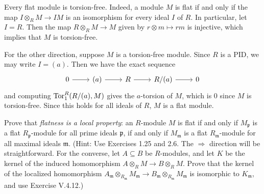\documentclass[../../master.tex]{subfiles}
\begin{document}
\begin{solution}
    Every flat module is torsion-free.
    Indeed, a module $M$ is flat if and only if the map $I \otimes_R M \to IM$ is an isomorphism for every ideal $I$ of $R$.
    In particular, let $I = R$.
    Then the map $R \otimes_R M \to M$ given by $r \otimes m \mapsto rm$ is injective, which implies that $M$ is torsion-free.

    For the other direction, suppose $M$ is a torsion-free module.
    Since $R$ is a PID, we may write $I = (a)$.
    Then we have the exact sequence
    \[
    \begin{tikzcd}
        0 & (a) & R & R/(a) & 0
        \arrow[from=1-1, to=1-2]
        \arrow[from=1-2, to=1-3]
        \arrow[from=1-3, to=1-4]
        \arrow[from=1-4, to=1-5] 
    \end{tikzcd}
    \]
    and computing $\operatorname{Tor}_1^{R}(R/(a), M)$ gives the $a$-torsion of $M$, which is 0 since $M$ is torsion-free.
    Since this holds for all ideals of $R$, $M$ is a flat module.
\end{solution}

\begin{problem}
    Prove that \textit{flatness is a local property}:
    an $R$-module $M$ is flat if and only if $M_{\mathfrak{p}}$ is a flat $R_{\mathfrak{p}}$-module for all prime ideals $\mathfrak{p}$, if and only if $M_{\mathfrak{m}}$ is a flat $R_{\mathfrak{m}}$-module for all maximal ideals $\mathfrak{m}$.
    (Hint: Use Exercises 1.25 and 2.6.
    The $\Longrightarrow$ direction will be straightforward.
    For the converse, let $A \subseteq B$ be $R$-modules, and let $K$ be the kernel of the induced homomorphism $A \otimes_R M \to B \otimes_R M$.
    Prove that the kernel of the localized homomorphism $A_{\mathfrak{m}} \otimes_{R_{\mathfrak{m}}} M_{\mathfrak{m}} \to B_{\mathfrak{m}} \otimes_{R_{\mathfrak{m}}} M_{\mathfrak{m}}$ is isomorphic to $K_{\mathfrak{m}}$, and use Exercise V.4.12.)
\end{problem}
\end{document}
